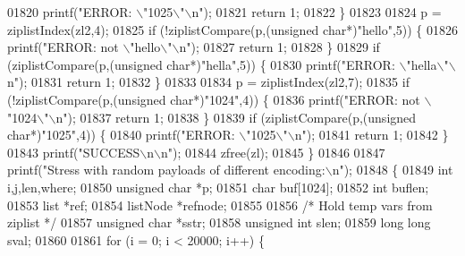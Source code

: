 \begin{DoxyCode}
{{{{{{{{{{{{{{{{{{{{{{{{{{{{{{01820             printf(\textcolor{stringliteral}{"ERROR: \(\backslash\)"1025\(\backslash\)"\(\backslash\)n"});
01821             \textcolor{keywordflow}{return} 1;
01822         \}
01823 
01824         p = ziplistIndex(zl2,4);
01825         \textcolor{keywordflow}{if} (!ziplistCompare(p,(\textcolor{keywordtype}{unsigned} \textcolor{keywordtype}{char}*)\textcolor{stringliteral}{"hello"},5)) \{
01826             printf(\textcolor{stringliteral}{"ERROR: not \(\backslash\)"hello\(\backslash\)"\(\backslash\)n"});
01827             \textcolor{keywordflow}{return} 1;
01828         \}
01829         \textcolor{keywordflow}{if} (ziplistCompare(p,(\textcolor{keywordtype}{unsigned} \textcolor{keywordtype}{char}*)\textcolor{stringliteral}{"hella"},5)) \{
01830             printf(\textcolor{stringliteral}{"ERROR: \(\backslash\)"hella\(\backslash\)"\(\backslash\)n"});
01831             \textcolor{keywordflow}{return} 1;
01832         \}
01833 
01834         p = ziplistIndex(zl2,7);
01835         \textcolor{keywordflow}{if} (!ziplistCompare(p,(\textcolor{keywordtype}{unsigned} \textcolor{keywordtype}{char}*)\textcolor{stringliteral}{"1024"},4)) \{
01836             printf(\textcolor{stringliteral}{"ERROR: not \(\backslash\)"1024\(\backslash\)"\(\backslash\)n"});
01837             \textcolor{keywordflow}{return} 1;
01838         \}
01839         \textcolor{keywordflow}{if} (ziplistCompare(p,(\textcolor{keywordtype}{unsigned} \textcolor{keywordtype}{char}*)\textcolor{stringliteral}{"1025"},4)) \{
01840             printf(\textcolor{stringliteral}{"ERROR: \(\backslash\)"1025\(\backslash\)"\(\backslash\)n"});
01841             \textcolor{keywordflow}{return} 1;
01842         \}
01843         printf(\textcolor{stringliteral}{"SUCCESS\(\backslash\)n\(\backslash\)n"});
01844         zfree(zl);
01845     \}
01846 
01847     printf(\textcolor{stringliteral}{"Stress with random payloads of different encoding:\(\backslash\)n"});
01848     \{
01849         \textcolor{keywordtype}{int} i,j,len,where;
01850         \textcolor{keywordtype}{unsigned} \textcolor{keywordtype}{char} *p;
01851         \textcolor{keywordtype}{char} buf[1024];
01852         \textcolor{keywordtype}{int} buflen;
01853         list *ref;
01854         listNode *refnode;
01855 
01856         \textcolor{comment}{/* Hold temp vars from ziplist */}
01857         \textcolor{keywordtype}{unsigned} \textcolor{keywordtype}{char} *sstr;
01858         \textcolor{keywordtype}{unsigned} \textcolor{keywordtype}{int} slen;
01859         \textcolor{keywordtype}{long} \textcolor{keywordtype}{long} sval;
01860 
01861         \textcolor{keywordflow}{for} (i = 0; i < 20000; i++) \{
}}}}}}}}}}}}}}}}}}}}}}}}}}}}}}
\end{DoxyCode}
